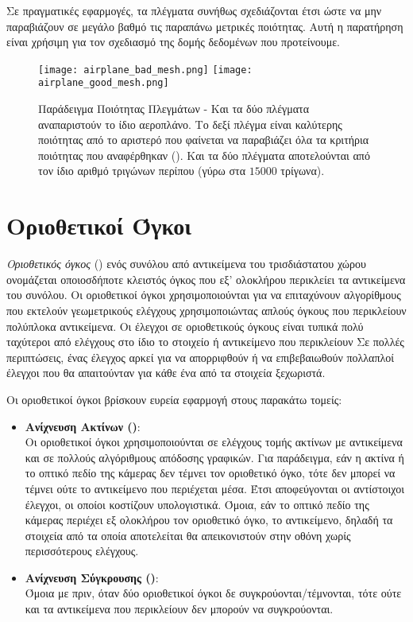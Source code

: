 Σε πραγματικές εφαρμογές, τα πλέγματα συνήθως σχεδιάζονται έτσι ώστε 
να μην παραβιάζουν σε μεγάλο βαθμό τις παραπάνω μετρικές ποιότητας.
Αυτή η παρατήρηση είναι χρήσιμη για τον σχεδιασμό της δομής δεδομένων 
που προτείνουμε.

\begin{figure}[h]
    \centering
    \texttt{[image: airplane\_bad\_mesh.png]}
    \texttt{[image: airplane\_good\_mesh.png]}
    \caption[Παράδειγμα Ποιότητας Πλεγμάτων]{
        Παράδειγμα Ποιότητας Πλεγμάτων - Και τα δύο πλέγματα 
        αναπαριστούν το ίδιο αεροπλάνο. Το δεξί πλέγμα είναι 
        καλύτερης ποιότητας από το αριστερό που φαίνεται να 
        παραβιάζει όλα τα κριτήρια ποιότητας που αναφέρθηκαν
        (). Και τα 
        δύο πλέγματα αποτελούνται από τον ίδιο αριθμό τριγώνων
        περίπου (γύρω στα $15000$ τρίγωνα).
    }
\end{figure}

\section{Οριοθετικοί Όγκοι}
\textit{Οριοθετικός όγκος} (\textbf{}) ενός συνόλου 
από αντικείμενα του τρισδιάστατου χώρου ονομάζεται οποιοσδήποτε 
κλειστός όγκος που εξ' ολοκλήρου περικλείει τα αντικείμενα του συνόλου. 
Οι οριοθετικοί όγκοι χρησιμοποιούνται για να επιταχύνουν αλγορίθμους   
που εκτελούν γεωμετρικούς ελέγχους χρησιμοποιώντας απλούς όγκους 
που περικλείουν πολύπλοκα αντικείμενα.
Οι έλεγχοι σε οριοθετικούς όγκους είναι τυπικά πολύ ταχύτεροι από 
ελέγχους στο ίδιο το στοιχείο ή αντικείμενο που περικλείουν 
Σε πολλές περιπτώσεις, ένας έλεγχος αρκεί για να απορριφθούν ή 
να επιβεβαιωθούν πολλαπλοί έλεγχοι που θα απαιτούνταν για κάθε ένα 
από τα στοιχεία ξεχωριστά.

Οι οριοθετικοί όγκοι βρίσκουν ευρεία εφαρμογή στους παρακάτω τομείς:
\begin{itemize}
    \item \textbf{Ανίχνευση Ακτίνων ()}:\\
    Oι οριοθετικοί όγκοι χρησιμοποιούνται σε ελέγχους τομής ακτίνων 
    με αντικείμενα και σε πολλούς αλγόριθμους απόδοσης γραφικών.
    Για παράδειγμα, εάν η ακτίνα ή το οπτικό πεδίο της κάμερας
    δεν τέμνει τον οριοθετικό όγκο, τότε δεν μπορεί να τέμνει ούτε 
    το αντικείμενο που περιέχεται μέσα. Έτσι αποφεύγονται οι 
    αντίστοιχοι έλεγχοι, οι οποίοι κοστίζουν υπολογιστικά.
    Όμοια, εάν το οπτικό πεδίο της κάμερας περιέχει εξ ολοκλήρου 
    τον οριοθετικό όγκο, το αντικείμενο, δηλαδή τα στοιχεία από τα
    οποία αποτελείται θα απεικονιστούν στην 
    οθόνη χωρίς περισσότερους ελέγχους. 
    
    \item \textbf{Ανίχνευση Σύγκρουσης ()}:\\
    Όμοια με πριν, όταν δύο οριοθετικοί όγκοι δε συγκρούονται/τέμνονται, 
    τότε ούτε και τα αντικείμενα που περικλείουν δεν μπορούν να συγκρούονται.
\end{itemize}

